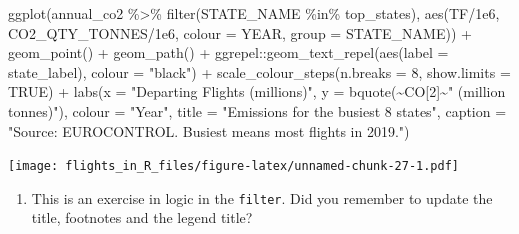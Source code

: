 \documentclass[
]{book}
\newenvironment{Shaded}{\begin{snugshade}}{\end{snugshade}}
\newcommand{\AttributeTok}[1]{\textcolor[rgb]{0.77,0.63,0.00}{#1}}
\newcommand{\ConstantTok}[1]{\textcolor[rgb]{0.00,0.00,0.00}{#1}}
\newcommand{\DecValTok}[1]{\textcolor[rgb]{0.00,0.00,0.81}{#1}}
\newcommand{\FloatTok}[1]{\textcolor[rgb]{0.00,0.00,0.81}{#1}}
\newcommand{\FunctionTok}[1]{\textcolor[rgb]{0.00,0.00,0.00}{#1}}
\newcommand{\NormalTok}[1]{#1}
\newcommand{\SpecialCharTok}[1]{\textcolor[rgb]{0.00,0.00,0.00}{#1}}
\newcommand{\StringTok}[1]{\textcolor[rgb]{0.31,0.60,0.02}{#1}}
\providecommand{\tightlist}{%
  \setlength{\itemsep}{0pt}\setlength{\parskip}{0pt}}
\begin{document}
\begin{Shaded}
\begin{Highlighting}[]
\FunctionTok{ggplot}\NormalTok{(annual\_co2 }\SpecialCharTok{\%\textgreater{}\%} 
         \FunctionTok{filter}\NormalTok{(STATE\_NAME }\SpecialCharTok{\%in\%}\NormalTok{ top\_states), }
       \FunctionTok{aes}\NormalTok{(TF}\SpecialCharTok{/}\FloatTok{1e6}\NormalTok{, CO2\_QTY\_TONNES}\SpecialCharTok{/}\FloatTok{1e6}\NormalTok{, }
           \AttributeTok{colour =}\NormalTok{ YEAR, }\AttributeTok{group =}\NormalTok{ STATE\_NAME)) }\SpecialCharTok{+}
  \FunctionTok{geom\_point}\NormalTok{() }\SpecialCharTok{+} 
  \FunctionTok{geom\_path}\NormalTok{() }\SpecialCharTok{+}
\NormalTok{  ggrepel}\SpecialCharTok{::}\FunctionTok{geom\_text\_repel}\NormalTok{(}\FunctionTok{aes}\NormalTok{(}\AttributeTok{label =}\NormalTok{ state\_label), }\AttributeTok{colour =} \StringTok{"black"}\NormalTok{) }\SpecialCharTok{+}
  \FunctionTok{scale\_colour\_steps}\NormalTok{(}\AttributeTok{n.breaks =} \DecValTok{8}\NormalTok{, }\AttributeTok{show.limits =} \ConstantTok{TRUE}\NormalTok{) }\SpecialCharTok{+}
  \FunctionTok{labs}\NormalTok{(}\AttributeTok{x =} \StringTok{"Departing Flights (millions)"}\NormalTok{, }
       \AttributeTok{y =} \FunctionTok{bquote}\NormalTok{(}\SpecialCharTok{\textasciitilde{}}\NormalTok{CO[}\DecValTok{2}\NormalTok{]}\SpecialCharTok{\textasciitilde{}}\StringTok{" (million tonnes)"}\NormalTok{),}
       \AttributeTok{colour =} \StringTok{"Year"}\NormalTok{,}
       \AttributeTok{title =} \StringTok{"Emissions for the busiest 8 states"}\NormalTok{,}
       \AttributeTok{caption =} \StringTok{"Source: EUROCONTROL. \textquotesingle{}Busiest\textquotesingle{} means most flights in 2019."}\NormalTok{)}
\end{Highlighting}
\end{Shaded}

\texttt{[image: flights\_in\_R\_files/figure-latex/unnamed-chunk-27-1.pdf]}

\begin{enumerate}
\def\labelenumi{\arabic{enumi})}
\setcounter{enumi}{1}
\tightlist
\item
  This is an exercise in logic in the \texttt{filter}. Did you remember to update the title, footnotes and the legend title?
\end{enumerate}
\end{document}
